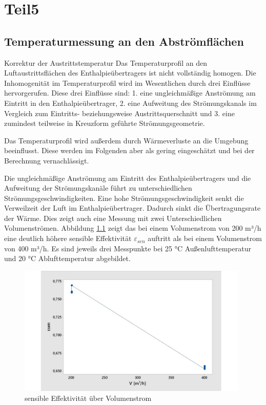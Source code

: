 \chapter{Teil5}
\label{cha:Teil5}

\section{Temperaturmessung an den Abströmflächen}
\label{sec:Temperaturmessung an den Abströmflächen}

Korrektur der Austrittstemperatur
Das Temperaturprofil an den Luftaustrittsflächen des Enthalpieübertragers ist nicht vollständig homogen. Die Inhomogenität im Temperaturprofil wird im Wesentlichen durch drei Einflüsse hervorgerufen. Diese drei Einflüsse sind:
1. eine ungleichmäßige Anströmung am Eintritt in den Enthalpieübertrager, 
2. eine Aufweitung des Strömungskanals im Vergleich zum Eintritts- beziehungsweise Austrittsquerschnitt und 
3. eine zumindest teilweise in Kreuzform geführte Strömungsgeometrie. 

Das Temperaturprofil wird außerdem durch Wärmeverluste an die Umgebung beeinflusst. Diese werden im Folgenden aber als gering eingeschätzt und bei der Berechnung vernachlässigt.


Die ungleichmäßige Anströmung am Eintritt des Enthalpieübertragers und die Aufweitung der Strömungskanäle führt zu unterschiedlichen Strömungsgeschwindigkeiten. Eine hohe Strömungsgeschwindigkeit senkt die Verweilzeit der Luft im Enthalpieübertrager. Dadurch sinkt die Übertragungsrate der Wärme. Dies zeigt auch eine Messung mit zwei Unterschiedlichen Volumenströmen. Abbildung \ref{Einfluss_Volumenstrom_sensible_Effektivitaet} zeigt das bei einem Volumenstrom von 200 m³/h eine deutlich höhere sensible Effektivität $\varepsilon_{sen}$ auftritt als bei einem Volumenstrom von 400 m³/h. Es sind jeweils drei Messpunkte bei 25 °C Außenlufttemperatur und 20 °C Ablufttemperatur abgebildet.

\begin{figure} [h]
	\centering
	\includegraphics[width=0.98\textwidth]{pictures/Einfluss_Volumenstrom_sensible_Effektivitaet.jpg}
	\caption{sensible Effektivität über Volumenstrom}
	\label{Einfluss_Volumenstrom_sensible_Effektivitaet}
\end{figure}

